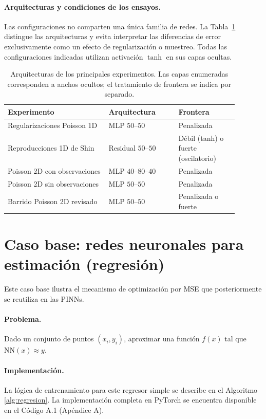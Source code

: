 \paragraph{Arquitecturas y condiciones de los ensayos.}
Las configuraciones no comparten una única familia de redes. La Tabla~\ref{tab:arquitecturas_computacionales} distingue las arquitecturas y evita interpretar las diferencias de error exclusivamente como un efecto de regularización o muestreo. Todas las configuraciones indicadas utilizan activación $\tanh$ en sus capas ocultas.
\begin{table}[htbp]
\centering
\caption{Arquitecturas de los principales experimentos. Las capas enumeradas corresponden a anchos ocultos; el tratamiento de frontera se indica por separado.}
\label{tab:arquitecturas_computacionales}
\small
\begin{tabular}{p{0.39\linewidth}p{0.27\linewidth}p{0.23\linewidth}}
\hline
Experimento & Arquitectura & Frontera \\
\hline
Regularizaciones Poisson 1D & MLP $50$--$50$ & Penalizada \\
Reproducciones 1D de Shin & Residual $50$--$50$ & Débil (tanh) o fuerte (oscilatorio) \\
Poisson 2D con observaciones & MLP $40$--$80$--$40$ & Penalizada \\
Poisson 2D sin observaciones & MLP $50$--$50$ & Penalizada \\
Barrido Poisson 2D revisado & MLP $50$--$50$ & Penalizada o fuerte \\
\hline
\end{tabular}
\end{table}

\section{Caso base: redes neuronales para estimación (regresión)}
\label{sec:regresion}

Este caso base ilustra el mecanismo de optimización por MSE que posteriormente se reutiliza en las PINNs. 

\paragraph{Problema.} Dado un conjunto de puntos $(x_i,y_i)$, aproximar una función $f(x)$ tal que $\text{NN}(x) \approx y$.

\paragraph{Implementación.} La lógica de entrenamiento para este regresor simple se describe en el Algoritmo \ref{alg:regresion}. La implementación completa en PyTorch se encuentra disponible en el Código A.1 (Apéndice A).

